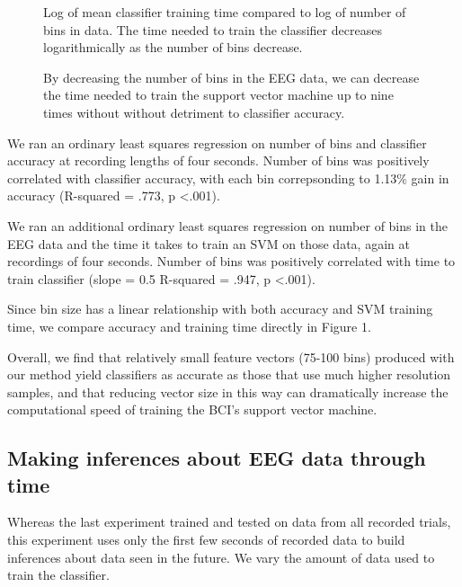  \begin{figure}[!h]
  \vspace{-0.2cm}
  \centering
   {}
  \caption{Log of mean classifier training time compared to log of number of bins in data. The time needed to train the classifier decreases logarithmically as the number of bins decrease.}
  \label{fig:fig1b}
  \vspace{-0.1cm}
 \end{figure}

\begin{figure}[!h]
  \vspace{-0.2cm}
  \centering
   {}
  \caption{ By decreasing the number of bins in the EEG data, we can decrease the time needed to train the support vector machine up to nine times without without detriment to classifier accuracy. }
  \label{fig:fig1c}
  \vspace{-0.1cm}
 \end{figure}

We ran an ordinary least squares regression on number of bins and classifier accuracy at recording lengths of four seconds. Number of bins was positively correlated with classifier accuracy, with each bin correpsonding to 1.13\% gain in accuracy (R-squared = .773, p \textless .001). 

We ran an additional ordinary least squares regression on number of bins in the EEG data and the time it takes to train an SVM on those data, again at recordings of four seconds. Number of bins was positively correlated with time to train classifier (slope = 0.5 R-squared = .947, p \textless .001).

Since bin size has a linear relationship with both accuracy and SVM training time, we compare accuracy and training time directly in Figure 1. 

Overall, we find that relatively small feature vectors (75-100 bins) produced with our method yield classifiers as accurate as those that use much higher resolution samples, and that reducing vector size in this way can dramatically increase the computational speed of training the BCI's support vector machine. 

\subsection{Making inferences about EEG data through time}

Whereas the last experiment trained and tested on data from all recorded trials, this experiment uses only the first few seconds of recorded data to build inferences about data seen in the future. We vary the amount of data used to train the classifier. 

